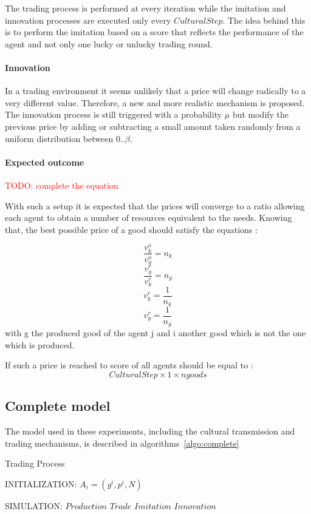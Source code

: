 \documentclass{wscpaperproc}
\newcommand{\memo}[2]{\textcolor{#1}{#2}}
\newcommand{\todo}[1]{\memo{red}{TODO: #1\\}}
\begin{document}
The trading process is performed at every iteration while the imitation and innovation processes are executed only every $CulturalStep$. The idea behind this is to perform the imitation based on a score that reflects the performance of the agent and not only one lucky or unlucky trading round.

\paragraph{Innovation} In a trading environment it seems unlikely that a price will change radically to a very different value. Therefore, a new and more realistic mechanism is proposed. The innovation process is still triggered with a probability $\mu$ 
but modify the previous price by adding or subtracting a small amount taken randomly from a uniform  distribution between $0 .. \beta$.


\paragraph{Expected outcome} 

\todo{complete the equation}

With such a setup it is expected that the prices will converge to a ratio allowing each agent to obtain a number of resources equivalent to the needs. Knowing that,  the best possible price of a good should satisfy the equations :

$$\frac{v^o_k}{v^o_g} = n_k $$
$$\frac{v^r_g}{v^r_k} = n_g $$
$$v^r_k = \frac{1}{n_k} $$
$$v^r_g = \frac{1}{n_g} $$
with g the produced good of the agent j and i another good which is not the one which is produced.

If such a price is reached to score of all agents should be equal to : $$ CulturalStep\times1\times ngoods $$


\subsection{Complete model}

The model used in these experiments, including the cultural transmission and trading mechanisms, is described in algorithms~\ref{algo:complete}

\begin{algorithm}
\caption{Trading Process}
\label{algo:complete}
	\begin{algorithmic}[1]
	\scriptsize
	\State INITIALIZATION: 
				\State $A_i = (g^i,p^i, N)$ 
			\EndFor
		\EndFor

	\State SIMULATION:
				\State $Production$
				\State $Trade$				
					\State $Imitation$
					\State $Innovation$
				\EndIf
			\EndFor
		\EndLoop
\end{algorithmic}
\end{algorithm}
\end{document}
